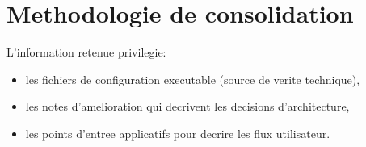 \section{Methodologie de consolidation}

L'information retenue privilegie:
\begin{itemize}[leftmargin=*]
  \item les fichiers de configuration executable (source de verite technique),
  \item les notes d'amelioration qui decrivent les decisions d'architecture,
  \item les points d'entree applicatifs pour decrire les flux utilisateur.
\end{itemize}
